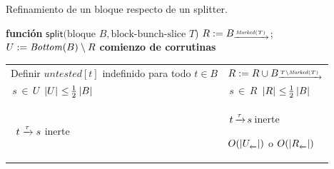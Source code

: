 \begin{algorithm}[tb]
	\caption{Refinamiento de un bloque respecto de un splitter.}
	\label{alg:split}
	\footnotesize\begin{algorithmic}[1]
	\STATE	\textbf{función} $\mathsf{split}(\text{bloque } B, \text{block-bunch-slice } T$)
	\STATE \label{alg:line-initRMarked}  $R:=B_{\pijl{\Marked(T)}}$; \quad
	       \label{alg:line-initU} $U := \mathit{Bottom}(B) \setminus R$
	\STATE	\textbf{comienzo de corrutinas} \label{alg:line-after-initU}
		\\[0.18\baselineskip]\setlength{\itemsep}{-0.7\baselineskip}%
	\begin{tabular}{@{}>{\raggedright\arraybackslash}p{6.9cm}||>{\raggedright\arraybackslash}p{5.3cm}@{}}
		\STATE	\hspace*{\algorithmicindent}Definir $\mathit{untested}[t]$ indefinido para todo $t \mathbin{\in} B$                       & $R:=R \cup B_{\pijl{T \setminus \Marked(T)}}$\label{alg:line-R-union-unmarked-T}\rightbrace[-2]{1}{$\bigo{\size{\Marked(T)}}$}\label{alg:line-initR}\label{alg:line-init-untested}\\
		\STATE	\hspace*{\algorithmicindent}\algorithmicforall\,$s\,{\in}\,U$ \algorithmicwhile\,$\left\lvert U \right\rvert\,{\leq}\,\frac{1}{2}\left\lvert B \right\rvert$\,\algorithmicdo & \algorithmicforall\,$s\,{\in}\,R$ \algorithmicwhile\,$\left\lvert R \right\rvert\,{\leq}\,\frac{1}{2}\left\lvert B \right\rvert$\,\algorithmicdo\rightbrace[-1]{1}{$\bigo{1}$ o $\bigo{\size{R_{\pijl{}}}}$}\\
		\STATE	\hspace*{2\algorithmicindent}\algorithmicforall\ $t \pijl{\tau} s$ inerte \algorithmicdo                                  & \hspace*{\algorithmicindent}\algorithmicforall\,$t\,{\pijl{\tau}}\,s$\,inerte \algorithmicdo\label{alg:line-for-inert-predecessors}\rightbrace[-1]{8}{\parbox[l]{0.3\textwidth}{$\bigo{\size{U_{\lijp{}}}}$ o \\ $\bigo{\size{R_{\lijp{}}}}$}}\\

\end{tabular}
\end{algorithmic}
\end{algorithm}

